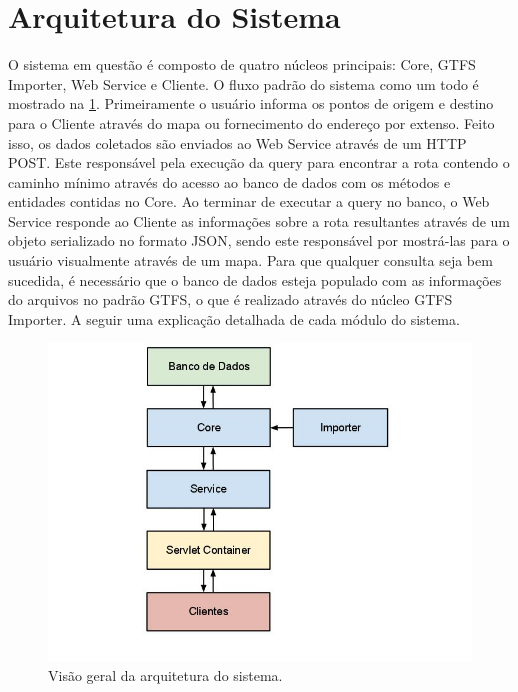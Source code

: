 \section{Arquitetura do Sistema}
O sistema em questão é composto de quatro núcleos principais: Core, GTFS Importer, Web Service e Cliente. 
O fluxo padrão do sistema como um todo é mostrado na \ref{fig:arquitetura}.
Primeiramente o usuário informa os pontos de origem e destino para o Cliente através do mapa ou fornecimento do endereço por extenso. 
Feito isso, os dados coletados são enviados ao Web Service através de um HTTP POST. 
Este responsável pela execução da query para encontrar a rota contendo o caminho mínimo através do acesso ao banco de dados com os métodos e entidades contidas no Core.
Ao terminar de executar a query no banco, o Web Service responde ao Cliente as informações sobre a rota resultantes através de um objeto serializado no formato JSON, sendo este responsável por mostrá-las para o usuário visualmente através de um mapa.
Para que qualquer consulta seja bem sucedida, é necessário que o banco de dados esteja populado com as informações do arquivos no padrão GTFS, o que é realizado através do núcleo GTFS Importer.
A seguir uma explicação detalhada de cada módulo do sistema.

\begin{figure}[!htb]
	\centering
	\includegraphics[width=1\textwidth]{./arquitetura.jpg} %
	\caption[ImgArquitetura]{Visão geral da arquitetura do sistema.}
	\label{fig:arquitetura}
\end{figure}

